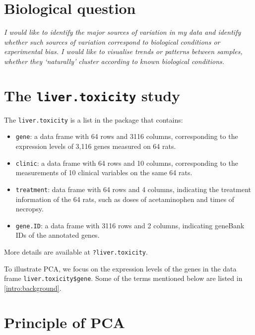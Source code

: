 \documentclass[]{book}
\begin{document}
\hypertarget{biological-question}{%
\section{Biological question}\label{biological-question}}

{
\emph{I would like to identify the major sources of variation in my data and identify whether such sources of variation correspond to biological conditions or experimental bias. I would like to visualise trends or patterns between samples, whether they `naturally' cluster according to known biological conditions.}
}

\hypertarget{the-liver.toxicity-study}{%
\section{\texorpdfstring{The \texttt{liver.toxicity} study}{The liver.toxicity study}}\label{the-liver.toxicity-study}}

The \texttt{liver.toxicity} is a list in the package that contains:

\begin{itemize}
\item
  \texttt{gene}: a data frame with 64 rows and 3116 columns, corresponding to the expression levels of 3,116 genes measured on 64 rats.
\item
  \texttt{clinic}: a data frame with 64 rows and 10 columns, corresponding to the measurements of 10 clinical variables on the same 64 rats.
\item
  \texttt{treatment}: data frame with 64 rows and 4 columns, indicating the treatment information of the 64 rats, such as doses of acetaminophen and times of necropsy.
\item
  \texttt{gene.ID}: a data frame with 3116 rows and 2 columns, indicating geneBank IDs of the annotated genes.
\end{itemize}

More details are available at \texttt{?liver.toxicity}.

To illustrate PCA, we focus on the expression levels of the genes in the data frame \texttt{liver.toxicity\$gene}. Some of the terms mentioned below are listed in \ref{intro:background}.

\hypertarget{principle-of-pca}{%
\section{Principle of PCA}\label{principle-of-pca}}
\end{document}
